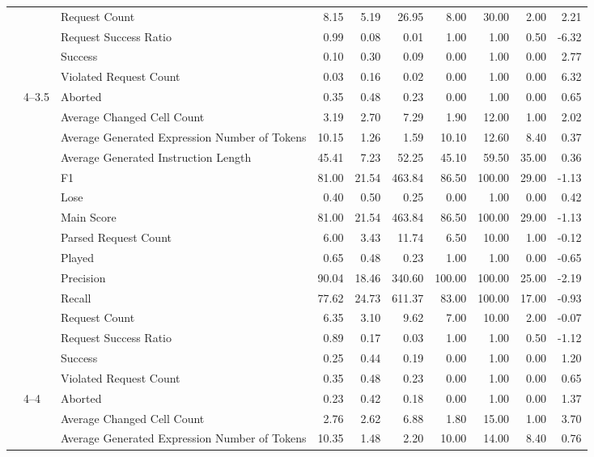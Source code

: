 \begin{tabular}{lllrrrrrrr}
 &  & Request Count & 8.15 & 5.19 & 26.95 & 8.00 & 30.00 & 2.00 & 2.21 \\
 &  & Request Success Ratio & 0.99 & 0.08 & 0.01 & 1.00 & 1.00 & 0.50 & -6.32 \\
 &  & Success & 0.10 & 0.30 & 0.09 & 0.00 & 1.00 & 0.00 & 2.77 \\
 &  & Violated Request Count & 0.03 & 0.16 & 0.02 & 0.00 & 1.00 & 0.00 & 6.32 \\
\cline{2-10}
 & \multirow[t]{15}{*}{4--3.5} & Aborted & 0.35 & 0.48 & 0.23 & 0.00 & 1.00 & 0.00 & 0.65 \\
 &  & Average Changed Cell Count & 3.19 & 2.70 & 7.29 & 1.90 & 12.00 & 1.00 & 2.02 \\
 &  & Average Generated Expression Number of Tokens & 10.15 & 1.26 & 1.59 & 10.10 & 12.60 & 8.40 & 0.37 \\
 &  & Average Generated Instruction Length & 45.41 & 7.23 & 52.25 & 45.10 & 59.50 & 35.00 & 0.36 \\
 &  & F1 & 81.00 & 21.54 & 463.84 & 86.50 & 100.00 & 29.00 & -1.13 \\
 &  & Lose & 0.40 & 0.50 & 0.25 & 0.00 & 1.00 & 0.00 & 0.42 \\
 &  & Main Score & 81.00 & 21.54 & 463.84 & 86.50 & 100.00 & 29.00 & -1.13 \\
 &  & Parsed Request Count & 6.00 & 3.43 & 11.74 & 6.50 & 10.00 & 1.00 & -0.12 \\
 &  & Played & 0.65 & 0.48 & 0.23 & 1.00 & 1.00 & 0.00 & -0.65 \\
 &  & Precision & 90.04 & 18.46 & 340.60 & 100.00 & 100.00 & 25.00 & -2.19 \\
 &  & Recall & 77.62 & 24.73 & 611.37 & 83.00 & 100.00 & 17.00 & -0.93 \\
 &  & Request Count & 6.35 & 3.10 & 9.62 & 7.00 & 10.00 & 2.00 & -0.07 \\
 &  & Request Success Ratio & 0.89 & 0.17 & 0.03 & 1.00 & 1.00 & 0.50 & -1.12 \\
 &  & Success & 0.25 & 0.44 & 0.19 & 0.00 & 1.00 & 0.00 & 1.20 \\
 &  & Violated Request Count & 0.35 & 0.48 & 0.23 & 0.00 & 1.00 & 0.00 & 0.65 \\
\cline{2-10}
 & \multirow[t]{15}{*}{4--4} & Aborted & 0.23 & 0.42 & 0.18 & 0.00 & 1.00 & 0.00 & 1.37 \\
 &  & Average Changed Cell Count & 2.76 & 2.62 & 6.88 & 1.80 & 15.00 & 1.00 & 3.70 \\
 &  & Average Generated Expression Number of Tokens & 10.35 & 1.48 & 2.20 & 10.00 & 14.00 & 8.40 & 0.76 \\

\end{tabular}
